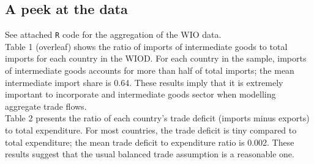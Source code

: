 \documentclass[12pt]{article}
\begin{document}
\subsection{A peek at the data}
See attached \verb|R| code for the aggregation of the WIO data.\\

Table 1 (overleaf) shows the ratio of imports of intermediate goods to total imports for each country in the WIOD. For each country in the sample, imports of intermediate goods accounts for more than half of total imports; the mean intermediate import share is 0.64. These results imply that it is extremely important to incorporate and intermediate goods sector when modelling aggregate trade flows.\\

Table 2 presents the ratio of each country's trade deficit (imports minus exports) to total expenditure. For most countries, the trade deficit is tiny compared to total expenditure; the mean trade deficit to expenditure ratio is 0.002. These results suggest that the usual balanced trade assumption is a reasonable one.
\end{document}
